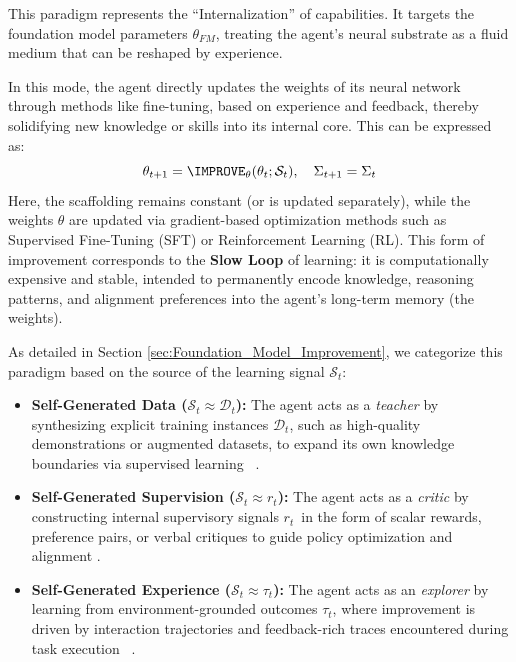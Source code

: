 This paradigm represents the ``Internalization'' of capabilities. It targets the foundation model parameters $\theta_{FM}$, treating the agent's neural substrate as a fluid medium that can be reshaped by experience. 

In this mode, the agent directly updates the weights of its neural network through methods like fine-tuning, based on experience and feedback, thereby solidifying new knowledge or skills into its internal core. This can be expressed as:
\begin{equation}
    \theta_{t+1} = \IMPROVE_{\theta}(\theta_{t}; \mathcal{S}_{t}), \quad \Sigma_{t+1} = \Sigma_{t}
\end{equation}
Here, the scaffolding remains constant (or is updated separately), while the weights $\theta$ are updated via gradient-based optimization methods such as Supervised Fine-Tuning (SFT) or Reinforcement Learning (RL). This form of improvement corresponds to the \textbf{Slow Loop} of learning: it is computationally expensive and stable, intended to permanently encode knowledge, reasoning patterns, and alignment preferences into the agent's long-term memory (the weights).

As detailed in Section \ref{sec:Foundation_Model_Improvement}, we categorize this paradigm based on the source of the learning signal $\mathcal{S}_t$:
\begin{itemize}
    \item \textbf{Self-Generated Data ($\mathcal{S}_t \approx \mathcal{D}_{t}$):} The agent acts as a \textit{teacher} by synthesizing explicit training instances $\mathcal{D}_{t}$, such as high-quality demonstrations or augmented datasets, to expand its own knowledge boundaries via supervised learning ~\citep{wang2022self, lu2023self, zhao2024selfguidebettertaskspecificinstruction, shi2025taskcraft}.
    \item \textbf{Self-Generated Supervision ($\mathcal{S}_t \approx r_{t}$):} The agent acts as a \textit{critic} by constructing internal supervisory signals $r_{t}$\ in the form of scalar rewards, preference pairs, or verbal critiques to guide policy optimization and alignment \citep{gong2025strive, huang2025beyond, bai2022constitutional, bensal2025reflect, zhang2025adaptive}.
    \item \textbf{Self-Generated Experience ($\mathcal{S}_t \approx \tau_{t}$):} The agent acts as an \textit{explorer} by learning from environment-grounded outcomes $\tau_{t}$, where improvement is driven by interaction trajectories and feedback-rich traces encountered during task execution ~\citep{wei2025codearc, dong2025tool, da2025agent, sun2025seagent}.
\end{itemize}

